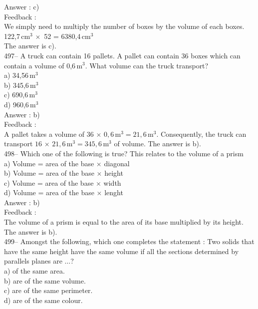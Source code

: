 ﻿\documentclass[letterpaper, 12pt]{article}
\begin{document}
Answer : c)\\

Feedback : \\
We simply need to multiply the number of boxes by the volume of each boxes.
\\
122,7\,cm$^{3}\,\times$ 52 = 6380,4\,cm$^{3}$\\
The answer is c).\\

497--  A truck can contain 16 pallets. A pallet can contain 36 boxes which can contain a volume of 0,6\,m$^{3}$. What volume can the truck transport?\\
a) 34,56\,m$^{3}$\\
b) 345,6\,m$^{3}$\\
c) 690,6\,m$^{3}$\\
d) 960,6\,m$^{3}$\\

Answer : b)\\

Feedback :\\
A pallet takes a volume of $36\,\times\,0,6$\,m$^{3}=21,6$\,m$^{3}$.
Consequently, the truck can transport $16\,\times\,21,6$\,m$^{3}=345,6$\,m$^{3}$ of volume.  The answer is b).\\

498-- Which one of the following is true? This relates to the volume of a prism\\
a) Volume = area of the base $\times$ diagonal\\
b) Volume = area of the base $\times$ height\\
c) Volume = area of the base $\times$ width\\
d) Volume = area of the base $\times$ lenght\\

Answer : b)\\

Feedback : \\
The volume of a prism is equal to the area of its base multiplied by its height.\\
The answer is b).\\

499-- Amongst the following, which one completes the statement : \og Two solids that have the same height have the same volume if all the sections determined by parallels planes are $\ldots$\fg ?\\
a) of the same area.\\
b) are of the same volume.\\
c) are of the same perimeter.\\
d) are of the same colour.\\
\end{document}
